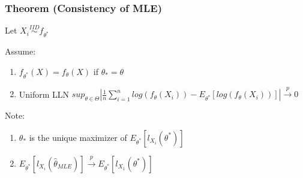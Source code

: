 \documentclass[aos,preprint]{imsart}
\numberwithin{equation}{section}
\theoremstyle{plain}
\begin{document}
\subsubsection{Theorem (Consistency of MLE)}
Let $ X_{i} \overset{IID} \sim f_{\theta^{*}}$

Assume:
\begin{enumerate}
\item $ f_{\theta^{*}}\left (X  \right ) = f_{\theta}\left (X  \right )$ if $ \theta_{*} = \theta $
\item Uniform LLN $ sup_{\theta \in \Theta}\left | \frac{1}{n}\sum_{i=1}^{n}log\left ( f_{\theta}\left ( X_{i} \right)\right) - E_{\theta^{*}}\left [log\left ( f_{\theta}\left ( X_{i} \right) \right )  \right ] \right | \overset{p} \rightarrow 0 $ 
\end{enumerate}

Note:
\begin{enumerate}
\item $ \theta_{*} $ is the unique maximizer of $ E_{\theta^{*}}\left [ l_{X_{i}}\left ( \theta^{*} \right ) \right ] $
\item $ E_{\theta^{*}}\left [ l_{X_{i}}\left ( \hat \theta_{MLE} \right ) \right ] \overset{p} \rightarrow E_{\theta^{*}}\left [ l_{X_{1}}\left ( \theta^{*} \right ) \right ] $ 
\end{enumerate}
\end{document}
